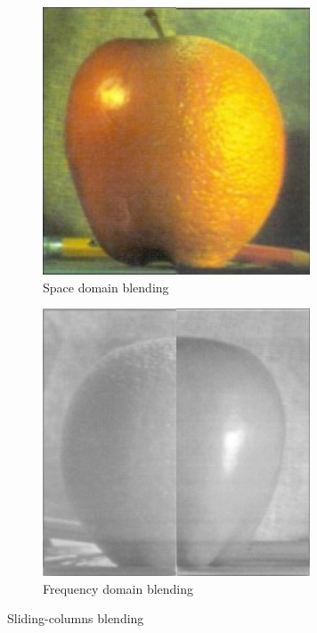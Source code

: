 \begin{figure}[h!]
\centering
\begin{subfigure}{0.5\textwidth}
  \centering
  \includegraphics[width=0.9\linewidth]{output/blending1.jpg}
  \caption{Space domain blending}
\end{subfigure}%
\begin{subfigure}{0.5\textwidth}
  \centering
  \includegraphics[width=0.9\linewidth]{output/left_right1.jpg}
  \caption{Frequency domain blending}
\end{subfigure}%
\caption{Sliding-columns blending}
\label{fig:comparison-blending}
\end{figure}


